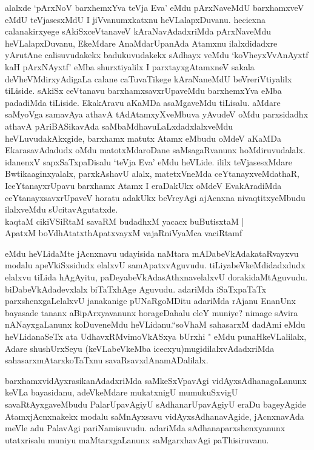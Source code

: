 \begin{artha}
alalxde `pArxNoV barxhemxYva teVja Eva' eMdu pArxNaveMdU barxhamxveV eMdU teVjasesxMdU I jiVvanumxkatxnu heVLalapxDuvanu. hecicxna calanakirxyege sAkiSxceVtanaveV kAraNavAdadxriMda pArxNaveMdu heVLalapxDuvanu, EkeMdare AnaMdarUpanAda Atamxnu ilalxdidadxre yArutAne calisuvudakekx badukuvudakekx sAdhayx veMdu `koVheyxVvAnAyxtf kaH pArxNAyxtf' eMba shurxtiyalilx I parxtayxgAtamxneV sakala deVheVMdirxyAdigaLa calane caTuvaTikege kAraNaneMdU beVreriVtiyalilx tiLiside. sAkiSx ceVtanavu barxhamxsavxrUpaveMdu barxhemxYva eMba padadiMda tiLiside. EkakAravu aKaMDa asaMgaveMdu tiLisalu. aMdare saMyoVga samavAya athavA tAdAtamxyXveMbuva yAvudeV oMdu parxsidadhx athavA pAriBASikavAda saMbaMdhavuLaLxdadxlalxveMdu heVLuvudakAkxgide, barxhamx matutx Atamx eMbudu oMdeV aKaMDa EkarasavAdadudx oMdu matotxMdaroDane saMsagaRvanunx hoMdiruvudalalx. idanenxV sapxSaTxpaDisalu `teVja Eva' eMdu heVLide. ililx teVjasesxMdare Bwtikaaginxyalalx, parxkAshavU alalx, matetxVneMda ceYtanayxveMdathaR, IceYtanayxrUpavu barxhamx Atamx I eraDakUkx oMdeV EvakAradiMda ceYtanayxsavxrUpaveV horatu adakUkx beVreyAgi ajAcnxna nivaqtitxyeMbudu ilalxveMdu sUcitavAgutatxde.\\
kaqtaM cikiVSiRtaM savaRM budadhxM yacacx buButisxtaM |\\
ApatxM boVdhAtatxthA\s \s patxvayxM vajaRniVyaMca vaciRtamf 
\end{artha}

\begin{artha}
eMdu heVLidaMte jAcnxnavu udayisida naMtara mADabeVkAdakataRvayxvu modalu apeVkiSxsidudx elalxvU samApatxvAguvudu. tiLiyabeVkeMdidadxdudx elalxvu tiLida hAgAyitu, paDeyabeVkAdasAthxnavelalxvU dorakidaMtAguvudu. biDabeVkAdadevxlalx biTaTxhAge Aguvudu. adariMda iSaTxpaTaTx parxshenxgaLelalxvU janakanige pUNaRgoMDitu adariMda rAjanu EnanUnx bayasade tananx aBipArxyavanunx horageDahalu eleY muniye? nimage sAvira nANayxgaLanunx koDuveneMdu heVLidanu.``soV\s haM sahasarxM dadAmi eMdu heVLidanaSeTx ata UdhavxRMvimoVkASxya bUrxhi " eMdu punaHkeVLalilalx, Adare shushUrxSeyu (keVLabeVkeMba icecxyu)mugidilalxvAdadxriMda sahasarxmAtarxkoTaTxnu savaRsavxdAnamADalilalx.
\end{artha}

\begin{artha}
barxhamxvidAyxrasikanAdadxriMda saMkeSxVpavAgi vidAyxsAdhanagaLanunx keVLa bayasidanu, adeVkeMdare mukatxnigU mumukuSxvigU savaRtAyxgaveMbudu PalarUpavAgiyU sAdhanarUpavAgiyU eraDu bageyAgide AtamxjAcnxnakekx modalu saMnAyxsavu vidAyxsAdhanavAgide, jAcnxnavAda meVle adu PalavAgi pariNamisuvudu. adariMda sAdhanaparxshenxyanunx utatxrisalu muniyu maMtarxgaLanunx saMgarxhavAgi paThisiruvanu.
\end{artha}


